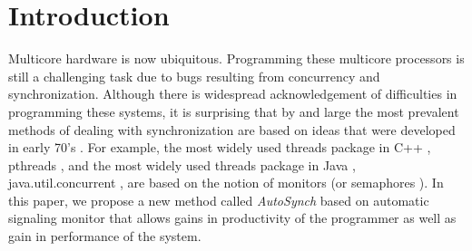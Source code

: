 \documentclass{sigplanconf}
\begin{document}
\section{Introduction} \label{sec:intro}





Multicore hardware is now ubiquitous. Programming these multicore processors is
still a challenging task due to
bugs resulting from concurrency and synchronization.
Although there is widespread acknowledgement of difficulties 
in programming these systems, it is surprising that by and large the most 
prevalent methods of dealing with synchronization are based on ideas that were 
developed in early 70's \cite{dijk68, hoa74, bh75a}. For 
example, the most widely used threads package in C++ \cite{stro97}, 
pthreads \cite{bute97}, and the most widely used threads package in Java \cite{gjs00}, 
java.util.concurrent \cite{lea05}, are based
on the notion of monitors \cite{hoa74, bh75a}(or semaphores 
\cite{dijk65, dijk68}). 
In this paper, we propose a new method called {\em AutoSynch} based on
automatic signaling monitor 
that allows gains in productivity of the programmer as well as gain in
performance of the system.
\end{document}
